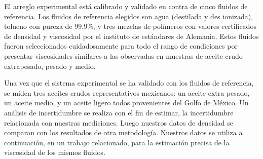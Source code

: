 El arreglo experimental está calibrado y validado en contra de cinco fluidos de referencia. Los fluidos de referencia elegidos son agua (destilada y des ionizada), tolueno con pureza de $99.9$\%, y tres mezclas de polímeros con valores certificados de densidad y viscosidad por el instituto de estándares de Alemania. Estos fluidos fueron seleccionados cuidadosamente para todo el rango de condiciones por presentar viscosidades similares a las observadas en muestras de aceite crudo extrapesado, pesado y medio.

Una vez que el sistema experimental se ha validado con los fluidos de referencia, se miden tres aceites crudos representativos mexicanos: un aceite extra pesado, un aceite medio, y un aceite ligero todos provenientes del Golfo de México. Un análisis de incertidumbre se realiza con el fin de estimar, la incertidumbre relacionada con nuestras mediciones. Luego nuestros datos de densidad se comparan con los resultados de otra metodología. Nuestros datos se utiliza a continuación, en un trabajo relacionado, para la estimación precisa de la viscosidad de los mismos fluidos.

\endgroup			


\vfill
